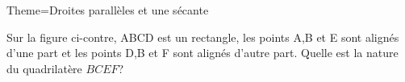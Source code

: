 \documentclass[a4paper,12pt]{article}
\begin{document}
\begin{Maquette}[Fiche]{Theme=Droites parallèles et une sécante}
\begin{exercice}
\begin{minipage}{0.5\linewidth}
Sur la figure ci-contre, ABCD est un rectangle, les points A,B et E sont alignés d'une part et les points D,B et F sont alignés d'autre part.
Quelle est la nature du quadrilatère $BCEF$?
\end{minipage}%
\begin{minipage}{0.5\linewidth}
\end{minipage}
\end{exercice}










\end{Maquette}
\end{document}

